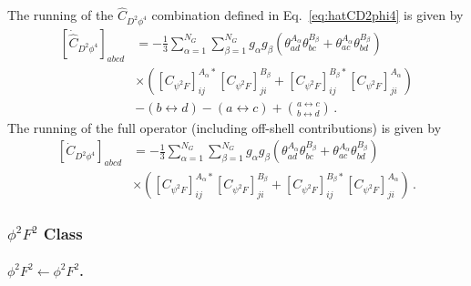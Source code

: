 The running of the $\widehat C_{D^2\phi^4}$ combination defined in Eq.~\eqref{eq:hatCD2phi4} is given by
\begin{align}
    \left[\dot{\widehat C}_{D^2\phi^4}\right]_{abcd} &= -\frac{1}{3} \sum_{\alpha=1}^{N_G} \sum_{\beta=1}^{N_G} g_\alpha g_\beta \left(\theta^{A_\alpha}_{ad}\theta^{B_\beta}_{bc} + \theta^{A_\alpha}_{ac}\theta^{B_\beta}_{bd}\right)\nonumber \\
    &\times 
    \left(
    \left[C_{\psi^2 F}\right]_{ij}^{A_\alpha *} \left[C_{\psi^2 F}\right]_{ji}^{B_\beta} + \left[C_{\psi^2 F}\right]_{ij}^{B_\beta *} \left[C_{\psi^2 F}\right]_{ji}^{A_\alpha}
    \right) \nonumber \\&-  (b \leftrightarrow d) - (a \leftrightarrow c) + \binom{a \leftrightarrow c}{b \leftrightarrow d}\,.
\end{align}
The running of the full operator (including off-shell contributions) is given by
\begin{align}
    \left[\dot C_{D^2\phi^4}\right]_{abcd} &= -\frac{1}{3} \sum_{\alpha=1}^{N_G} \sum_{\beta=1}^{N_G} g_\alpha g_\beta \left(\theta^{A_\alpha}_{ad}\theta^{B_\beta}_{bc} + \theta^{A_\alpha}_{ac}\theta^{B_\beta}_{bd}\right)\nonumber \\
    &\times 
    \left(
    \left[C_{\psi^2 F}\right]_{ij}^{A_\alpha *} \left[C_{\psi^2 F}\right]_{ji}^{B_\beta} + \left[C_{\psi^2 F}\right]_{ij}^{B_\beta *} \left[C_{\psi^2 F}\right]_{ji}^{A_\alpha}
    \right)\,.
\end{align}

\subsubsection{\texorpdfstring{$\phi^2F^2$}{phi2F2} Class}
\paragraph{\texorpdfstring{$\phi^2F^2 \leftarrow \phi^2F^2$.}{phi2F2fromphi2F2}}
\label{par:phi2F2<-phi2F2}

